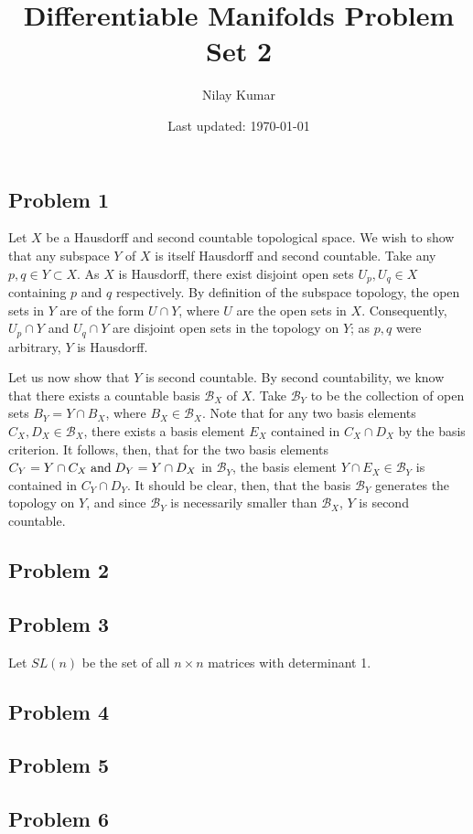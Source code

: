 \documentclass{../../mathnotes}
\title{Differentiable Manifolds Problem Set 2}
\author{Nilay Kumar}
\date{Last updated: \today}
\begin{document}
\maketitle

\subsection*{Problem 1}

Let $X$ be a Hausdorff and second countable topological space. We wish to show that any subspace $Y$ of $X$ is itself Hausdorff
and second countable. Take any $p,q\in Y\subset X$. As $X$ is Hausdorff, there exist disjoint open sets $U_p, U_q\in X$ containing $p$ and $q$
respectively. By definition of the subspace topology, the open sets in $Y$ are of the form $U\cap Y$, where $U$ are the open sets in $X$.
Consequently, $U_p\cap Y$ and $U_q\cap Y$ are disjoint open sets in the topology on $Y$; as $p,q$ were arbitrary, $Y$ is Hausdorff.

Let us now show that $Y$ is second countable. By second countability, we know that there exists a countable basis $\mathcal{B}_X$ of $X$.
Take $\mathcal{B}_Y$ to be the collection of open sets $B_Y=Y\cap B_X$, where $B_X\in\mathcal{B}_X$. 
Note that for any two basis elements $C_X, D_X\in\mathcal{B}_X$, there exists a basis element $E_X$ contained in $C_X\cap D_X$ by the basis
criterion. It follows, then, that for the two basis elements
$C_Y=Y\cap C_X \;\textnormal{and}\; D_Y=Y\cap D_X$ in $\mathcal{B}_Y$, the basis element $Y\cap E_X\in \mathcal{B}_Y$ is contained in $C_Y\cap D_Y$.
It should be clear, then, that the basis $\mathcal{B}_Y$ generates the topology on $Y$, and since $\mathcal{B}_Y$ is necessarily smaller
than $\mathcal{B}_X$, $Y$ is second countable.

\subsection*{Problem 2}

\subsection*{Problem 3}

Let $SL(n)$ be the set of all $n\times n$ matrices with determinant 1.

\subsection*{Problem 4}

\subsection*{Problem 5}

\subsection*{Problem 6}
\end{document}
